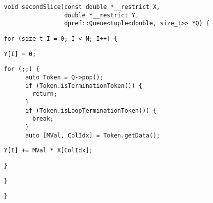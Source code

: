 \begin{lstlisting}[style=cppcode]
void secondSlice(const double *__restrict X,
                 double *__restrict Y,
                 dpref::Queue<tuple<double, size_t>> *Q) {
\end{lstlisting}\vspace{-\baselineskip}

\begin{lstlisting}[style=cppcode, backgroundcolor=\color{yellow!15}, firstnumber=last]
  for (size_t I = 0; I < N; I++) {
\end{lstlisting}\vspace{-\baselineskip}

\begin{lstlisting}[style=cppcode, backgroundcolor=\color{red!15}, firstnumber=last]
    Y[I] = 0;
\end{lstlisting}\vspace{-\baselineskip}

\begin{lstlisting}[style=cppcode, firstnumber=last]
    for (;;) {
      auto Token = Q->pop();
      if (Token.isTerminationToken()) {
        return;
      }
      if (Token.isLoopTerminationToken()) {
        break;
      }
      auto [MVal, ColIdx] = Token.getData();
\end{lstlisting}\vspace{-\baselineskip}

\begin{lstlisting}[style=cppcode, backgroundcolor=\color{red!15}, firstnumber=last]
      Y[I] += MVal * X[ColIdx];
\end{lstlisting}\vspace{-\baselineskip}

\begin{lstlisting}[style=cppcode, firstnumber=last]
    }
\end{lstlisting}\vspace{-\baselineskip}

\begin{lstlisting}[style=cppcode, backgroundcolor=\color{yellow!15}, firstnumber=last]
  }
\end{lstlisting}\vspace{-\baselineskip}

\begin{lstlisting}[style=cppcode, firstnumber=last]
}
\end{lstlisting}\vspace{-\baselineskip}
